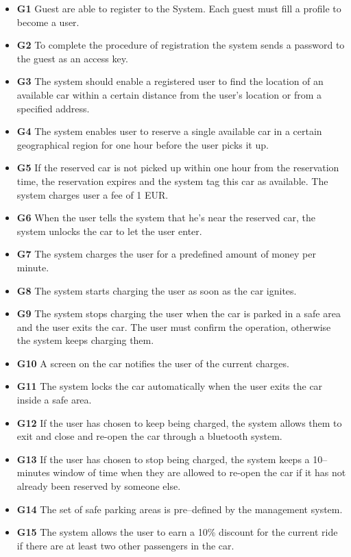 			\begin{itemize}
				\item \textbf{G1} Guest are able to register to the System. Each guest must fill a profile to become a user. %
				\item \textbf{G2} To complete the procedure of registration the system sends a password to the guest as an access key. %
				\item \textbf{G3} The system should enable a registered user to find the location of an available car within a certain distance from the user's location or from a specified address.
				\item \textbf{G4} The system enables user to reserve a single available car in a certain geographical region for one hour before the user picks it up.
				\item \textbf{G5} If the reserved car is not picked up within one hour from the reservation time, the reservation expires and the system tag this car as available. The system charges user a fee of 1 EUR. 
				\item \textbf{G6} When the user tells the system that he's near the reserved car, the system unlocks the car to let the user enter.  

				\item \textbf{G7} The system charges the user for a predefined amount of money per minute.
				\item \textbf{G8} The system starts charging the user as soon as the car ignites.
				\item \textbf{G9} The system stops charging the user when the car is parked in a safe area and the user exits the car. The user must confirm the operation, otherwise the system keeps charging them. 
				\item \textbf{G10} A screen on the car notifies the user of the current charges.
				\item \textbf{G11} The system locks the car automatically when the user exits the car inside a safe area.  
				\item \textbf{G12} If the user has chosen to keep being charged, the system allows them to exit and close and re-open the car through a bluetooth system. %
				\item \textbf{G13} If the user has chosen to stop being charged, the system keeps a 10–minutes window of time when they are allowed to re-open the car if it has not already been reserved by someone else.
				\item \textbf{G14} The set of safe parking areas is pre–defined by the management system.
				\item \textbf{G15} The system allows the user to earn a 10\% discount for the current ride if there are at least two other passengers in the car.


\end{itemize}
